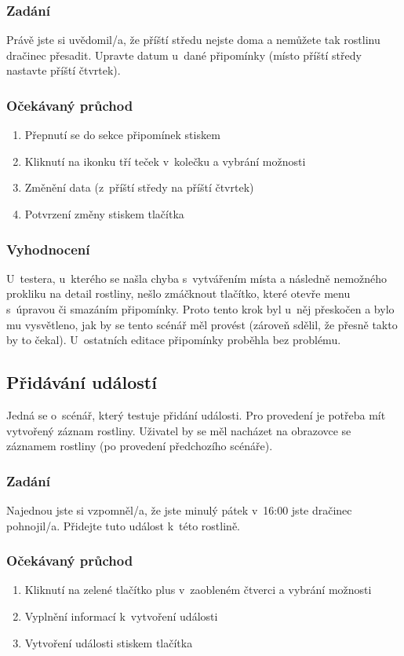 \documentclass[thesis=M,czech]{FITthesis}[2019/12/23]
\begin{document}
\subsubsection*{Zadání}
Právě jste si uvědomil/a, že příští středu nejste doma a nemůžete tak rostlinu dračinec přesadit. Upravte datum u~dané připomínky (místo příští středy nastavte příští čtvrtek).
\subsubsection*{Očekávaný průchod}
\begin{enumerate}
    \item Přepnutí se do sekce připomínek stiskem 
    \item Kliknutí na ikonku tří teček v~kolečku a vybrání možnosti 
    \item Změnění data (z~příští středy na příští čtvrtek)
    \item Potvrzení změny stiskem tlačítka 
\end{enumerate}
\subsubsection*{Vyhodnocení}
U~testera, u~kterého se našla chyba s~vytvářením místa a následně nemožného prokliku na detail rostliny, nešlo zmáčknout tlačítko, které otevře menu s~úpravou či smazáním připomínky. Proto tento krok byl u~něj přeskočen a bylo mu vysvětleno, jak by se tento scénář měl provést (zároveň sdělil, že přesně takto by to čekal). U~ostatních editace připomínky proběhla bez problému.

\subsection{Přidávání událostí}
Jedná se o~scénář, který testuje přidání události. Pro provedení je potřeba mít vytvořený záznam rostliny. Uživatel by se měl nacházet na obrazovce se záznamem rostliny (po provedení předchozího scénáře).
\subsubsection*{Zadání}
Najednou jste si vzpomněl/a, že jste minulý pátek v~16:00 jste dračinec pohnojil/a. Přidejte tuto událost k~této rostlině.
\subsubsection*{Očekávaný průchod}
\begin{enumerate}
    \item Kliknutí na zelené tlačítko plus v~zaobleném čtverci a vybrání možnosti 
    \item Vyplnění informací k~vytvoření události
    \item Vytvoření události stiskem tlačítka 
\end{enumerate}
\end{document}
